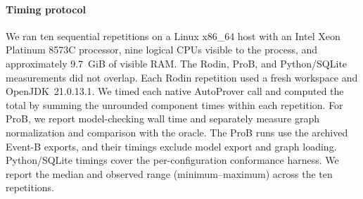 \paragraph{Timing protocol}
We ran ten sequential repetitions on a Linux x86\_64 host with
an Intel Xeon Platinum 8573C processor, nine logical CPUs visible
to the process, and approximately 9.7~GiB of visible RAM.
The Rodin, ProB, and Python/SQLite measurements did not overlap.
Each Rodin repetition used a fresh workspace and OpenJDK~21.0.13.1.
We timed each native AutoProver call and computed the total by
summing the unrounded component times within each repetition.
For ProB, we report model-checking wall time and separately
measure graph normalization and comparison with the oracle.
The ProB runs use the archived Event-B exports, and their timings
exclude model export and graph loading. Python/SQLite timings
cover the per-configuration conformance harness.
We report the median and observed range (minimum--maximum)
across the ten repetitions.
